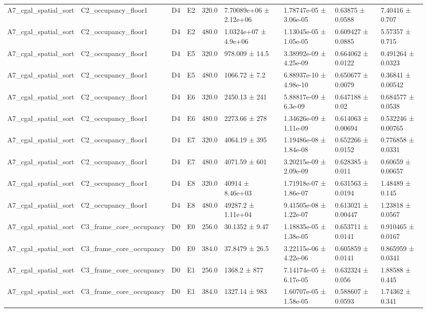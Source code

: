 \begin{table}
\begin{tabular}{lllllllll}
A7\_cgal\_spatial\_sort & C2\_occupancy\_floor1 & D4 & E2 & 320.0 & 7.70089e+06 ± 2.12e+06 & 1.78747e-05 ± 3.06e-05 & 0.63875 ± 0.0588 & 7.40416 ± 0.707 \\
A7\_cgal\_spatial\_sort & C2\_occupancy\_floor1 & D4 & E2 & 480.0 & 1.0324e+07 ± 4.9e+06 & 1.13045e-05 ± 1.05e-05 & 0.609427 ± 0.0885 & 5.57357 ± 0.715 \\
A7\_cgal\_spatial\_sort & C2\_occupancy\_floor1 & D4 & E5 & 320.0 & 978.009 ± 14.5 & 3.38992e-09 ± 4.25e-09 & 0.664062 ± 0.0122 & 0.491264 ± 0.0323 \\
A7\_cgal\_spatial\_sort & C2\_occupancy\_floor1 & D4 & E5 & 480.0 & 1066.72 ± 7.2 & 6.88937e-10 ± 4.98e-10 & 0.650677 ± 0.0079 & 0.36841 ± 0.00542 \\
A7\_cgal\_spatial\_sort & C2\_occupancy\_floor1 & D4 & E6 & 320.0 & 2450.13 ± 241 & 5.88817e-09 ± 6.3e-09 & 0.647188 ± 0.02 & 0.684577 ± 0.0538 \\
A7\_cgal\_spatial\_sort & C2\_occupancy\_floor1 & D4 & E6 & 480.0 & 2273.66 ± 278 & 1.34626e-09 ± 1.11e-09 & 0.614063 ± 0.00694 & 0.532246 ± 0.00765 \\
A7\_cgal\_spatial\_sort & C2\_occupancy\_floor1 & D4 & E7 & 320.0 & 4064.19 ± 395 & 1.19486e-08 ± 1.84e-08 & 0.652266 ± 0.0152 & 0.776858 ± 0.0331 \\
A7\_cgal\_spatial\_sort & C2\_occupancy\_floor1 & D4 & E7 & 480.0 & 4071.59 ± 601 & 3.20215e-09 ± 2.09e-09 & 0.628385 ± 0.011 & 0.60659 ± 0.00657 \\
A7\_cgal\_spatial\_sort & C2\_occupancy\_floor1 & D4 & E8 & 320.0 & 40914 ± 8.46e+03 & 1.71918e-07 ± 1.86e-07 & 0.631563 ± 0.0194 & 1.48489 ± 0.145 \\
A7\_cgal\_spatial\_sort & C2\_occupancy\_floor1 & D4 & E8 & 480.0 & 49287.2 ± 1.11e+04 & 9.41505e-08 ± 1.22e-07 & 0.613021 ± 0.00447 & 1.23818 ± 0.0567 \\
A7\_cgal\_spatial\_sort & C3\_frame\_core\_occupancy & D0 & E0 & 256.0 & 30.1352 ± 9.47 & 1.18835e-05 ± 1.38e-05 & 0.653711 ± 0.0141 & 0.910465 ± 0.0167 \\
A7\_cgal\_spatial\_sort & C3\_frame\_core\_occupancy & D0 & E0 & 384.0 & 37.8479 ± 26.5 & 3.22115e-06 ± 4.22e-06 & 0.605859 ± 0.0141 & 0.865959 ± 0.0341 \\
A7\_cgal\_spatial\_sort & C3\_frame\_core\_occupancy & D0 & E1 & 256.0 & 1368.2 ± 877 & 7.14174e-05 ± 6.17e-05 & 0.632324 ± 0.056 & 1.88588 ± 0.445 \\
A7\_cgal\_spatial\_sort & C3\_frame\_core\_occupancy & D0 & E1 & 384.0 & 1327.14 ± 983 & 1.60707e-05 ± 1.58e-05 & 0.588607 ± 0.0593 & 1.74362 ± 0.341 \\

\end{tabular}
\end{table}
